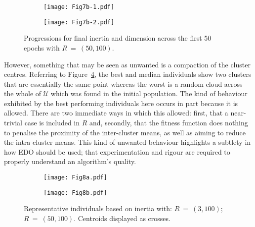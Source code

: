 \begin{figure}[htbp]
    \centering
    \begin{subfigure}{\imgwidth}
        \texttt{[image: Fig7b-1.pdf]}
        \caption{}\label{fig:edo:inertia:large:fitness}
    \end{subfigure}

    \begin{subfigure}{\imgwidth}
        \texttt{[image: Fig7b-2.pdf]}
        \caption{}\label{fig:edo:inertia:large:dimension}
    \end{subfigure}
    \caption{%
        Progressions for final inertia and dimension across the first 50 epochs
        with \(R~=~(50,100)\).
    }\label{fig:large-inertia-50}
\end{figure}

However, something that may be seen as unwanted is a compaction of the cluster
centres. Referring to Figure~\ref{fig:small-inertia-inds}, the best and median
individuals show two clusters that are essentially the same point whereas the
worst is a random cloud across the whole of \(\mathcal{U}\) which was found in
the initial population. The kind of behaviour exhibited by the best performing
individuals here occurs in part because it is allowed. There are two immediate
ways in which this allowed: first, that a near-trivial case is included in \(R\)
and, secondly, that the fitness function does nothing to penalise the proximity
of the inter-cluster means, as well as aiming to reduce the intra-cluster means.
This kind of unwanted behaviour highlights a subtlety in how EDO should be used;
that experimentation and rigour are required to properly understand an
algorithm's quality.

\begin{figure}[htbp]
    \centering
    \begin{subfigure}{\imgwidth}
        \texttt{[image: Fig8a.pdf]}
        \caption{}\label{fig:small-inertia-inds}
    \end{subfigure}

    \begin{subfigure}{\imgwidth}
        \texttt{[image: Fig8b.pdf]}
        \caption{}\label{fig:large-inertia-inds}
    \end{subfigure}
    \caption{%
        Representative individuals based on inertia with:
         \(R~=~(3,100)\);
         \(R~=~(50,100)\). Centroids displayed as
        crosses.
    }\label{fig:inertia-inds}
\end{figure}

